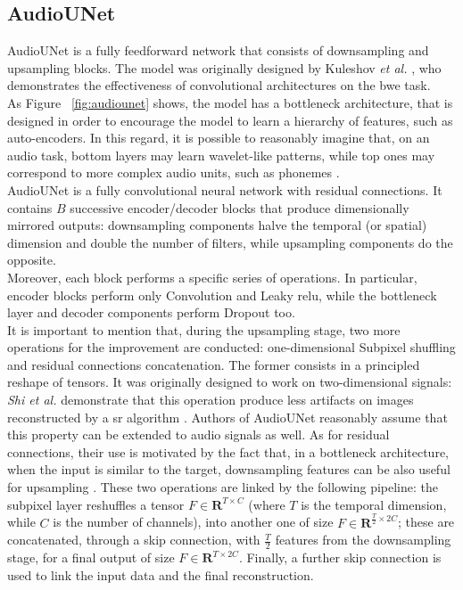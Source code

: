 \subsection{AudioUNet} \label{audiounet}
AudioUNet is a fully feedforward network that consists of downsampling and upsampling blocks. The model was originally designed by Kuleshov \textit{et al.} \cite{kuleshov2017audio}, who demonstrates the effectiveness of convolutional architectures on the \gls{bwe} task. \\
As Figure ~\ref{fig:audiounet} shows, the model has a bottleneck architecture, that is designed in order to encourage the model to learn a hierarchy of features, such as auto-encoders. In this regard, it is possible to reasonably imagine that, on an audio task, bottom layers may learn wavelet-like patterns, while top ones may correspond to more complex audio units, such as phonemes \cite{aytar2016soundnet}.\\
AudioUNet is a fully convolutional neural network with residual connections. It contains $B$ successive encoder/decoder blocks that produce dimensionally mirrored outputs: downsampling components halve the temporal (or spatial) dimension and double the number of filters, while upsampling components do the opposite. \\
Moreover, each block performs a specific series of operations. In particular, encoder blocks perform only Convolution and Leaky \gls{relu}, while the bottleneck layer and decoder components perform Dropout too. \\
It is important to mention that, during the upsampling stage, two more operations for the improvement are conducted: one-dimensional Subpixel shuffling and residual connections concatenation. The former consists in a principled reshape of tensors. It was originally designed to work on two-dimensional signals: \textit{Shi et al.} demonstrate that this operation produce less artifacts on images reconstructed by a \gls{sr} algorithm \cite{shi2016real}. Authors of AudioUNet reasonably assume that this property can be extended to audio signals as well. As for residual connections, their use is motivated by the fact that, in a bottleneck architecture, when the input is similar to the target, downsampling features can be also useful for upsampling \cite{zhang2016colorful}. These two operations are linked by the following pipeline: the subpixel layer reshuffles a tensor $F \in \mathbf{R}^{T \times C}$ (where $T$ is the temporal dimension, while $C$ is the number of channels), into another one of size $F \in \mathbf{R}^{\frac{T}{2} \times2C}$; these are concatenated, through a skip connection, with $\frac{T}{2}$ features from the downsampling stage, for a final output of size $F \in \mathbf{R}^{T \times2C}$. Finally, a further skip connection is used to link the input data and the final reconstruction.
